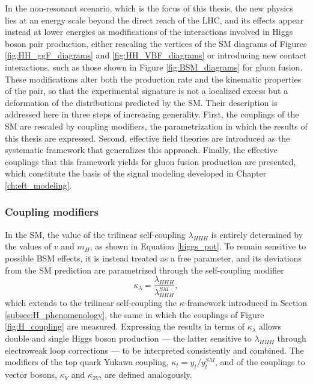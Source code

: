 In the non-resonant scenario, which is the focus of this thesis, the new physics lies at an energy scale beyond the direct reach of the LHC, and its effects appear instead at lower energies as modifications of the interactions involved in Higgs boson pair production, either rescaling the vertices of the SM diagrams of Figures \ref{fig:HH_ggF_diagrams} and \ref{fig:HH_VBF_diagrams} or introducing new contact interactions, such as those shown in Figure \ref{fig:BSM_diagrams} for gluon fusion. These modifications alter both the production rate and the kinematic properties of the pair, so that the experimental signature is not a localized excess but a deformation of the distributions predicted by the SM. Their description is addressed here in three steps of increasing generality. First, the couplings of the SM are rescaled by coupling modifiers, the parametrization in which the results of this thesis are expressed. Second, effective field theories are introduced as the systematic framework that generalizes this approach. Finally, the effective couplings that this framework yields for gluon fusion production are presented, which constitute the basis of the signal modeling developed in Chapter \ref{ch:eft_modeling}.



\subsubsection{Coupling modifiers}
\label{subsubsec:coupling_modifiers}
%
In the SM, the value of the trilinear self-coupling $\lambda_{HHH}$ is entirely determined by the values of $v$ and $m_H$, as shown in Equation \ref{higgs_pot}. To remain sensitive to possible BSM effects, it is instead treated as a free parameter, and its deviations from the SM prediction are parametrized through the self-coupling modifier
%
\begin{equation}
    \kappa_{\lambda} = \frac{\lambda_{HHH}}{\lambda_{HHH}^{SM}},
    \label{eq:kappa_lambda}
\end{equation}
which extends to the trilinear self-coupling the $\kappa$-framework introduced in Section \ref{subsec:H_phenomenology}, the same in which the couplings of Figure \ref{fig:H_coupling} are measured. Expressing the results in terms of $\kappa_\lambda$ allows double and single Higgs boson production — the latter sensitive to $\lambda_{HHH}$ through electroweak loop corrections — to be interpreted consistently and combined. The modifiers of the top quark Yukawa coupling, $\kappa_t = y_t/y_t^{SM}$, and of the couplings to vector bosons, $\kappa_V$ and $\kappa_{2V}$, are defined analogously.


